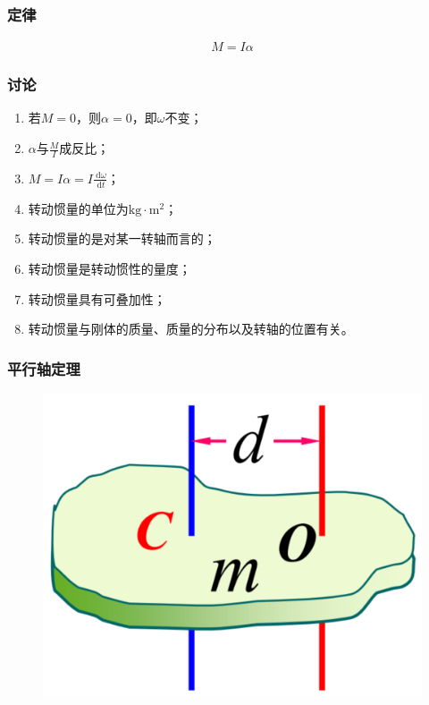 \documentclass[12pt, a4paper]{article}
\numberwithin{equation}{section}
\newcommand{\rmd}{\mathrm{~d}}
\newcommand{\deriv}[2]{\frac{\rmd #1}{\rmd #2}}
\begin{document}
\subsubsection{定律}

    \begin{align}
        M = I \alpha
    \end{align}

\subsubsection{讨论}

    \begin{enumerate}
        \item 若\(M=0\)，则\(\alpha=0\)，即\(\omega\)不变；
        \item \(\alpha \)与\(\frac{M}{I}\)成反比；
        \item \(M = I\alpha = I\deriv{\omega}{t}\)；
        \item 转动惯量的单位为\(\mathrm{kg} \cdot \mathrm{m^2}\)；
        \item 转动惯量的是对某一转轴而言的；
        \item 转动惯量是转动惯性的量度；
        \item 转动惯量具有可叠加性；
        \item 转动惯量与刚体的质量、质量的分布以及转轴的位置有关。
    \end{enumerate}

\subsubsection{平行轴定理}

    \begin{figure}
        \centering
        \includegraphics[scale=0.2]{"Chapter 04 images/pic6.png"}
        \label{pic4-6}
    \end{figure}
\end{document}
